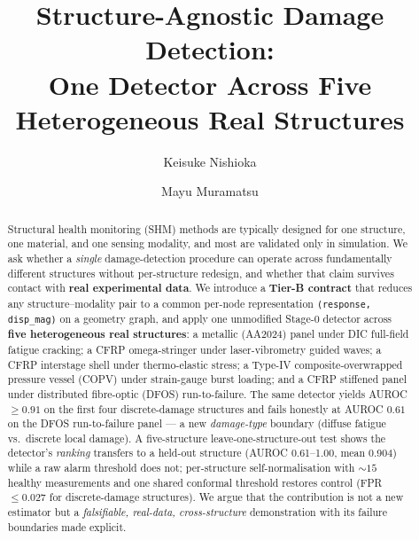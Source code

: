 \documentclass[10pt]{llncs}      %
\begin{document}
\title{Structure-Agnostic Damage Detection:\\ One Detector Across Five Heterogeneous Real Structures}

\author{Keisuke Nishioka \and
        Mayu Muramatsu}   %


\maketitle

\begin{abstract}
  Structural health monitoring (SHM) methods are typically designed for one
  structure, one material, and one sensing modality, and most are validated
  only in simulation.
  We ask whether a \emph{single} damage-detection procedure can operate across
  fundamentally different structures without per-structure redesign, and
  whether that claim survives contact with \textbf{real experimental data}.
  We introduce a \textbf{Tier-B contract} that reduces any structure--modality
  pair to a common per-node representation \texttt{(response, disp\_mag)} on a
  geometry graph, and apply one unmodified Stage-0 detector across
  \textbf{five heterogeneous real structures}: a metallic (AA2024) panel under
  DIC full-field fatigue cracking; a CFRP omega-stringer under laser-vibrometry
  guided waves; a CFRP interstage shell under thermo-elastic stress; a
  Type-IV composite-overwrapped pressure vessel (COPV) under strain-gauge burst
  loading; and a CFRP stiffened panel under distributed fibre-optic (DFOS)
  run-to-failure.
  The same detector yields AUROC $\geq 0.91$ on the first four discrete-damage
  structures and fails honestly at AUROC $0.61$ on the DFOS run-to-failure panel
  --- a new \emph{damage-type} boundary (diffuse fatigue vs.\ discrete local
  damage).
  A five-structure leave-one-structure-out test shows the detector's
  \emph{ranking} transfers to a held-out structure (AUROC 0.61--1.00, mean
  0.904) while a raw alarm threshold does not; per-structure self-normalisation
  with $\sim\!15$ healthy measurements and one shared conformal threshold
  restores control (FPR $\leq 0.027$ for discrete-damage structures).
  We argue that the contribution is not a new estimator but a
  \emph{falsifiable, real-data, cross-structure} demonstration with its failure
  boundaries made explicit.
\end{abstract}
\end{document}
